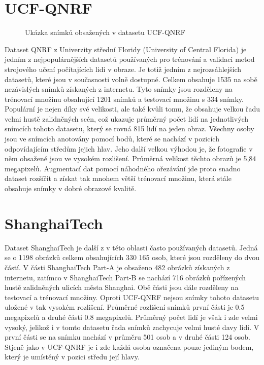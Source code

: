 \section{UCF-QNRF}
\begin{figure}[h!]
	\centering
	\caption{Ukázka snímků obsažených v datasetu UCF-QNRF \cite{QNRF}}
	\label{fig:QNRF}
\end{figure}

Dataset QNRF \cite{QNRF} z Univerzity střední Floridy (University of Central Florida) je jedním z nejpopulárnějších datasetů používaných pro trénování a validaci metod strojového učení počítajících lidi v obraze.
Je totiž jedním z nejrozsáhlejších datasetů, které jsou v současnosti volně dostupné.
Celkem obsahuje 1535 na sobě nezávislých snímků získaných z internetu.
Tyto snímky jsou rozděleny na trénovací množinu obsahující 1201 snímků a testovací množinu s 334 snímky.
Populární je nejen díky své velikosti, ale také kvůli tomu, že obsahuje velkou řadu velmi hustě zalidněných scén, což ukazuje průměrný počet lidí na jednotlivých snímcích tohoto datasetu, který se rovná 815 lidí na jeden obraz.
Všechny osoby jsou ve snímcích anotovány pomocí bodů, které se nachází v pozicích odpovídajícím středům jejich hlav.
Jeho další velkou výhodou je, že fotografie v něm obsažené jsou ve vysokém rozlišení.
Průměrná velikost těchto obrazů je 5,84 megapixelů.
Augmentací dat pomocí náhodného ořezávání jde proto snadno dataset rozšířit a získat tak mnohem větší trénovací množinu, která stále obsahuje snímky v dobré obrazové kvalitě.


\section{ShanghaiTech}
Dataset ShanghaiTech \cite{ShanghaiTech} je další z v této oblasti často používaných datasetů.
Jedná se o 1198 obrázků celkem obsahujících 330 165 osob, které jsou rozděleny do dvou částí.
V části ShanghaiTech Part-A je obsaženo 482 obrázků získaných z internetu, zatímco v ShanghaiTech Part-B se nachází 716 obrázků pořízených hustě zalidněných ulicích města Shanghai. Obě části jsou dále rozděleny na testovací a trénovací množiny.
Oproti UCF-QNRF nejsou snímky tohoto datasetu uložené v tak vysokém rozlišení. Průměrné rozlišení snímků první části je 0.5 megapixelů a druhé části 0.8 megapixelů.
Průměrný počet lidí je však i zde velmi vysoký, jelikož i v tomto datasetu řada snímků zachycuje velmi husté davy lidí. V první části se na snímku nachází v průměru 501 osob a v druhé části 124 osob.
Stjeně jako v UCF-QNRF je i zde každá osoba označena pouze jediným bodem, který je umístěný v pozici středu její hlavy.

